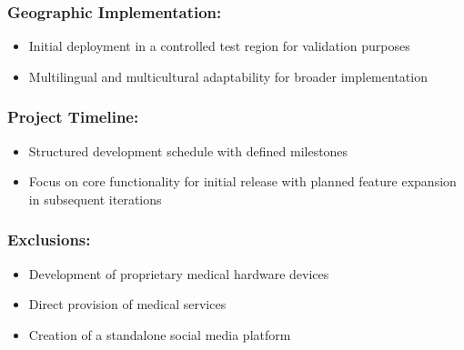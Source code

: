 \subsubsection*{Geographic Implementation:}
\begin{itemize}
    \item Initial deployment in a controlled test region for validation purposes
    \item Multilingual and multicultural adaptability for broader implementation
\end{itemize}

\subsubsection*{Project Timeline:}
\begin{itemize}
    \item Structured development schedule with defined milestones
    \item Focus on core functionality for initial release with planned feature expansion in subsequent iterations
\end{itemize}

\subsubsection*{Exclusions:}
\begin{itemize}
    \item Development of proprietary medical hardware devices
    \item Direct provision of medical services
    \item Creation of a standalone social media platform
\end{itemize}